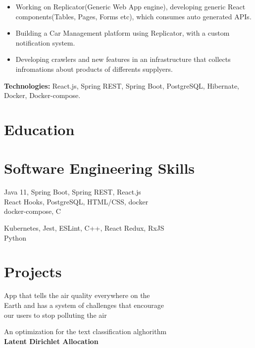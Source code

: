 \documentclass[9pt]{article}
\begin{document}
\begin{paracol}{2}
		{
		\begin{itemize}
			\item Working on Replicator(Generic Web App engine), developing generic React components(Tables, Pages, Forms etc), which consumes auto generated APIs.
			\item Building a Car Management platform using Replicator, with a custom notification system.
			\item Developing crawlers and new features in an infrastructure that collects infromations about products of differents supplyers.
		\end{itemize}
		\rule{0mm}{5mm}\textbf{Technologies:} React.js, Spring REST, Spring Boot, PostgreSQL, Hibernate, Docker, Docker-compose.
            }

\section{Education}



\section{Software Engineering Skills}

	{
		Java 11, Spring Boot, Spring REST, React.js\\
		React Hooks, PostgreSQL, HTML/CSS, docker\\
		docker-compose, C
	}


	{
		Kubernetes, Jest, ESLint, C++, React Redux, RxJS\\
		Python
	}


\section{Projects}

	{
		App that tells the air quality everywhere on the\\
		Earth and has a system of challenges that encourage\\
		our users to stop polluting the air
	}

	{
		An optimization for the text classification alghorithm \\
		\bf Latent Dirichlet Allocation
	}

\end{paracol}
\end{document}
